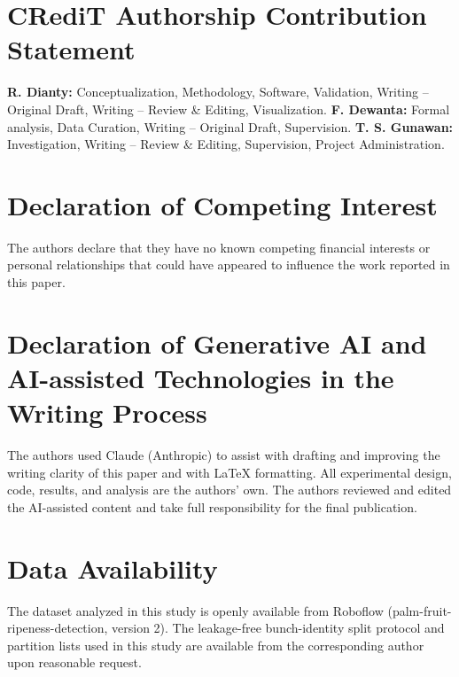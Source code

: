 \documentclass[conference, compsoc, twoside]{IEEEtran}
\begin{document}
\section*{CRediT Authorship Contribution Statement}
\textbf{R. Dianty:} Conceptualization, Methodology, Software, Validation, Writing -- Original Draft, Writing -- Review \& Editing, Visualization. \textbf{F. Dewanta:} Formal analysis, Data Curation, Writing -- Original Draft, Supervision. \textbf{T. S. Gunawan:} Investigation, Writing -- Review \& Editing, Supervision, Project Administration.

\section*{Declaration of Competing Interest}
The authors declare that they have no known competing financial interests or personal relationships that could have appeared to influence the work reported in this paper.

\section*{Declaration of Generative AI and AI-assisted Technologies in the Writing Process}
The authors used Claude (Anthropic) to assist with drafting and improving the writing clarity of this paper and with LaTeX formatting. All experimental design, code, results, and analysis are the authors' own. The authors reviewed and edited the AI-assisted content and take full responsibility for the final publication.

\section*{Data Availability}
The dataset analyzed in this study is openly available from Roboflow (palm-fruit-ripeness-detection, version 2). The leakage-free bunch-identity split protocol and partition lists used in this study are available from the corresponding author upon reasonable request.

\balance



\end{document}
